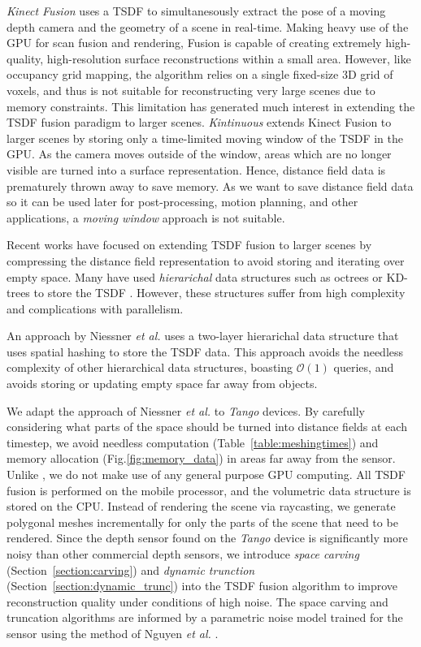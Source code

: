 \documentclass[conference]{IEEEtran}
\newcommand{\sref}[1]{Section~\ref{#1}}
\newcommand{\figref}[1]{Fig.\ref{#1}}
\newcommand{\tabref}[1]{Table~\ref{#1}}
\newcommand{\etal}{\textit{et al.}}
\begin{document}
\emph{Kinect Fusion} \cite{Newcombe} uses a TSDF to simultanesously extract the
pose of a moving depth camera and the geometry of a scene in real-time. Making
heavy use of the GPU for scan fusion and rendering, Fusion is capable of
creating extremely high-quality, high-resolution surface reconstructions within
a small area. However, like occupancy grid mapping, the algorithm relies on a
single fixed-size 3D grid of voxels, and thus is not suitable for reconstructing
very large scenes due to memory constraints. This limitation has generated much
interest in extending the TSDF fusion paradigm to larger scenes. 
\emph{Kintinuous} \cite{Whelan2013} extends Kinect Fusion to larger scenes by
storing only a time-limited moving window of the TSDF in the GPU. As the camera moves
outside of the window, areas which are no longer visible are turned into a
surface representation. Hence, distance field data is prematurely thrown away
to save memory. As we want to save distance field data so it can be used later
for post-processing, motion planning, and other applications, a \textit{moving
window} approach is not suitable.

Recent works have focused on extending TSDF fusion to larger scenes by
compressing the distance field representation to avoid storing and iterating
over empty space. Many have used \textit{hierarichal} data structures such as
octrees or KD-trees to store the TSDF \cite{Zeng2012, Chen2012}. However, these
structures suffer from high complexity and complications with parallelism. 

An approach by Niessner \etal \cite{NiessnerHashing} uses a two-layer
hierarichal data structure that uses spatial hashing \cite{SpatialHashing} to
store the TSDF data. This approach avoids the needless complexity of other
hierarchical data structures, boasting $\mathcal{O}(1)$ queries, and avoids
storing or updating empty space far away from objects.

We adapt the approach of Niessner \etal \cite{NiessnerHashing} to
\textit{Tango} devices. By carefully considering what parts of the space should
be turned into distance fields at each timestep, we avoid needless computation
(\tabref{table:meshingtimes}) and memory allocation (\figref{fig:memory_data})
in areas far away from the sensor. Unlike \cite{NiessnerHashing}, we do not make
use of any general purpose GPU computing. All TSDF fusion is performed on the
mobile processor, and the volumetric data structure is stored on the CPU.
Instead of rendering the scene via raycasting, we generate polygonal meshes
incrementally for only the parts of the scene that need to be rendered. Since
the depth sensor found on the \textit{Tango} device is significantly more noisy
than other commercial depth sensors, we introduce \textit{space carving}
(\sref{section:carving}) and \textit{dynamic trunction} (\sref{section:dynamic_trunc}) into
the TSDF fusion algorithm to improve reconstruction quality under conditions of
high noise. The space carving and truncation algorithms are informed by a
parametric noise model trained for the sensor using the method of Nguyen \etal
\cite{Nguyen2012}.
\end{document}
